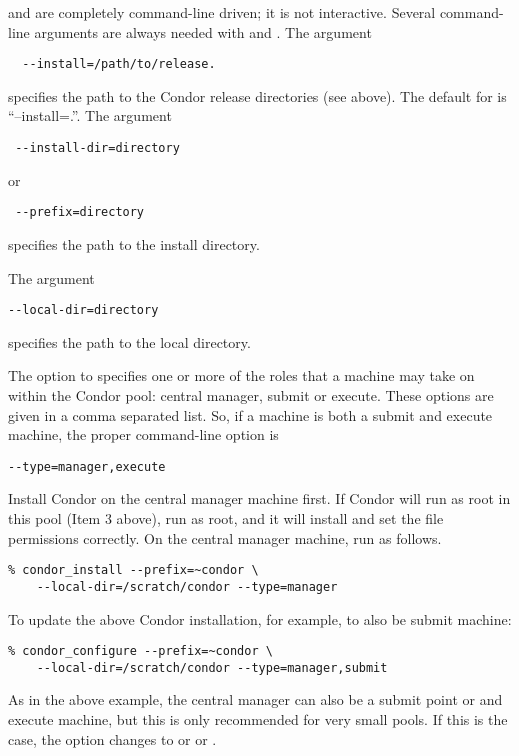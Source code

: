  and  are completely command-line
driven; it is not interactive.  Several command-line arguments are
always needed with  and .
The argument
\begin{verbatim}
  --install=/path/to/release.
\end{verbatim}
specifies the path to the Condor release directories (see above).
The default for  is ``--install=.''.
The argument
\begin{verbatim} --install-dir=directory \end{verbatim}
or
\begin{verbatim} --prefix=directory \end{verbatim}
specifies the path to the install directory.

The argument
\begin{verbatim}
--local-dir=directory
\end{verbatim}
specifies the path to the local directory.

The  option to 
specifies one or more of the roles that a machine may take on
within the Condor pool: central manager, submit or execute.
These options are given in a comma separated list.
So, if a machine is both a submit and execute
machine, 
the proper command-line option is
\begin{verbatim}
--type=manager,execute
\end{verbatim}

Install Condor on the central manager machine first.  If Condor
will run as root in this pool (Item 3 above), run  
as root, and it will install and set the file permissions correctly.  
On the central manager machine, run  as follows.
\begin{verbatim}
% condor_install --prefix=~condor \
	--local-dir=/scratch/condor --type=manager
\end{verbatim}

To update the above Condor installation, for example, to also be
submit machine:
\begin{verbatim}
% condor_configure --prefix=~condor \
	--local-dir=/scratch/condor --type=manager,submit
\end{verbatim}

As in the above example, the central manager can also be a submit
point or and execute machine, but this is only recommended for very
small pools.  If this is the case, the  option changes to
 or   or 
.

